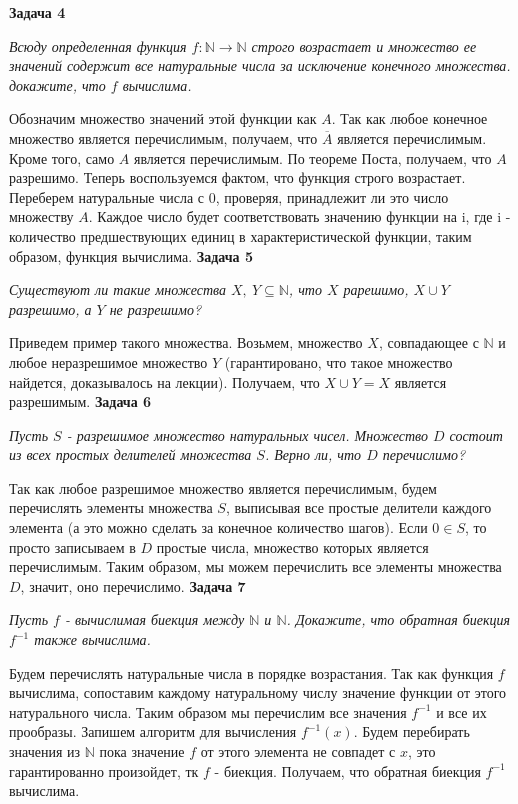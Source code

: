 \documentclass{article}
\begin{document}
\newline
\newline
 \noindent \textbf{Задача 4}
\begin{center}
\textit{Всюду определенная функция $f: \mathbb{N} \rightarrow\mathbb{N}$ строго возрастает и множество ее значений содержит все натуральные числа за исключение конечного множества. докажите, что $f$ вычислима.}
\end{center}
 Обозначим множество значений этой функции как $A$. Так как любое конечное множество является перечислимым, получаем, что $\overline{A}$ является перечислимым. Кроме того, само $A$ является перечислимым. По теореме Поста, получаем, что $A$ разрешимо. Теперь воспользуемся фактом, что функция строго возрастает. Переберем натуральные числа с 0, проверяя, принадлежит ли это число множеству $A$. Каждое число будет соответствовать значению функции на i, где i - количество предшествующих единиц в характеристической функции, таким образом, функция вычислима.
\newline \newline
 \noindent \textbf{Задача 5}
\begin{center}
\textit{Существуют ли такие множества $X,~Y \subseteq \mathbb{N}$, что $X$ рарешимо, $X\cup Y$ разрешимо, а $Y$ не разрешимо?} 
\end{center}
Приведем пример такого множества. Возьмем, множество $X$, совпадающее с $\mathbb{N}$ и любое неразрешимое множество $Y$ (гарантировано, что такое множество найдется, доказывалось на лекции). Получаем, что $X\cup Y=X$ является разрешимым.
\newline \newline
 \noindent \textbf{Задача 6}
\begin{center}
\textit{Пусть $S$ - разрешимое множество натуральных чисел. Множество $D$ состоит из всех простых делителей множества $S$. Верно ли, что $D$ перечислимо?}
\end{center}
Так как любое разрешимое множество является перечислимым, будем перечислять элементы множества $S$, выписывая все простые делители каждого элемента (а это можно сделать за конечное количество шагов). Если $0 \in S$, то просто записываем в  $D$ простые числа, множество которых является перечислимым. Таким образом, мы можем перечислить все элементы множества $D$, значит, оно перечислимо. 
\newline
\newline \newline
 \noindent \textbf{Задача 7}
\begin{center}
\textit{Пусть $f$ -  вычислимая биекция между $\mathbb{N}$ и $\mathbb{N}$. Докажите, что обратная биекция $f^{-1}$ также вычислима.}
\end{center}
Будем перечислять натуральные числа в порядке возрастания. Так как функция $f$ вычислима, сопоставим каждому натуральному числу значение функции от этого натурального числа. Таким образом мы перечислим все значения $f^{-1}$ и все их прообразы.
Запишем алгоритм для вычисления $f^{-1}(x)$. Будем перебирать значения из $\mathbb{N}$ пока значение $f$ от этого элемента не совпадет с $x$, это гарантированно произойдет, тк $f$ - биекция.
Получаем, что обратная биекция $f^{-1}$ вычислима.
\newline
\newline 
\end{document}
